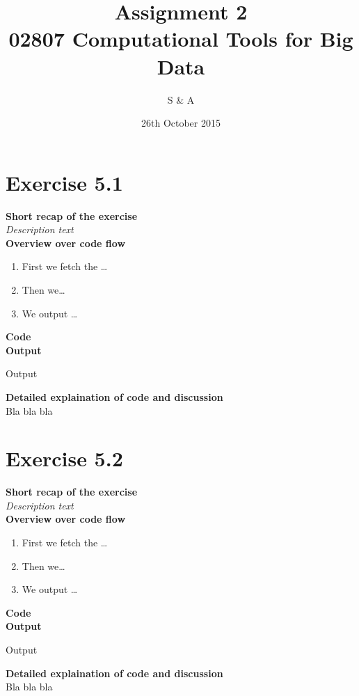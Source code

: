 \documentclass{article}
\title{Assignment 2\\02807 Computational Tools for Big Data}
\author{S \& A}
\date{26th October 2015}
\newcommand\pythonstyle{\lstset{
language=python,
breaklines=true,
basicstyle=\ttfamily\small,
otherkeywords={1, 2, 3, 4, 5, 6, 7, 8 ,9 , 0, -, =, +, [, ], (, ), \{, \}, :, *, !},             %
keywordstyle=\color{blue},
emph={class, pass, in, for, while, if, is, elif, else, not, and, or, OR
    def, print, exec, break, continue, return},
emphstyle=\color{black}\bfseries,
emph={[2]True, False, None, self},
emphstyle=[2]\color{purple},
emph={[3]from, import, as},
emphstyle=[3]\color{blue},
stringstyle=\color{red},
frame=tb,
showstringspaces=false,
morecomment=[s]{"""}{"""},
commentstyle=\color{gray},
rulesepcolor=\color{blue},
title=\lstname
}}
\newcommand\pythonexternal[2][]{{
\pythonstyle
}}
\begin{document}
\maketitle
\newpage
\section{Exercise 5.1}
\textbf{Short recap of the exercise}\\
\textit{Description text}\\

\textbf{Overview over code flow}\\

\begin{enumerate}
  \item First we fetch the \ldots
  \item Then we\ldots
  \item We output \ldots\\
\end{enumerate}

\textbf{Code}\\
\textbf{Output}
\begin{pythonOutput}
Output
\end{pythonOutput}
\textbf{Detailed explaination of code and discussion}\\
Bla bla bla


\section{Exercise 5.2}
\textbf{Short recap of the exercise}\\
\textit{Description text}\\

\textbf{Overview over code flow}\\

\begin{enumerate}
  \item First we fetch the \ldots
  \item Then we\ldots
  \item We output \ldots\\
\end{enumerate}

\textbf{Code}\\
\textbf{Output}
\begin{pythonOutput}
Output
\end{pythonOutput}
\textbf{Detailed explaination of code and discussion}\\
Bla bla bla
\end{document}
